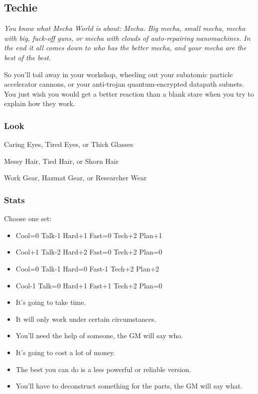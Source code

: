 \subsection{Techie}
{\itshape You know what Mecha World is about: Mecha. Big mecha, small mecha, mecha with big, fuck-off guns, or mecha with clouds of auto-repairing nanomachines. In the end it all comes down to who has the better mecha, and your mecha are the best of the best.

So you'll toil away in your workshop, wheeling out your subatomic particle accelerator cannons, or your anti-trojan quantum-encrypted datapath subnets. You just wish you would get a better reaction than a blank stare when you try to explain how they work.}

\subsubsection{Look}

Caring Eyes, Tired Eyes, or Thick Glasses

Messy Hair, Tied Hair, or Shorn Hair

Work Gear, Hazmat Gear, or Researcher Wear

\subsubsection{Stats}
Choose one set:
\begin{itemize}
\setlength\itemsep{0em}
\item Cool=0 Talk-1 Hard+1 Fast=0 Tech+2 Plan+1
\item Cool+1 Talk-2 Hard+2 Fast=0 Tech+2 Plan=0
\item Cool=0 Talk-1 Hard=0 Fast-1 Tech+2 Plan+2
\item Cool-1 Talk=0 Hard+1 Fast+1 Tech+2 Plan=0
\end{itemize}

\begin{itemize}
\item It's going to take time.
\item It will only work under certain circumstances.
\item You'll need the help of someone, the GM will say who.
\item It's going to cost a lot of money.
\item The best you can do is a less powerful or reliable version.
\item You’ll have to deconstruct something for the parts, the GM will say what.
\end{itemize}

